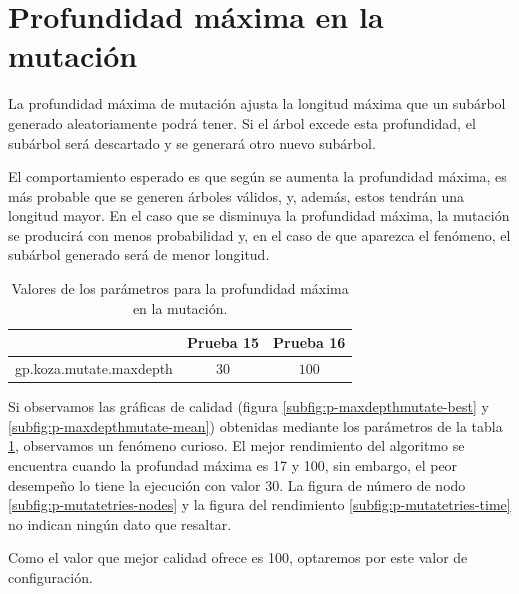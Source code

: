 \section{Profundidad máxima en la mutación}\label{sec:p-prof-mut}	

La profundidad máxima de mutación ajusta la longitud máxima que un subárbol
generado aleatoriamente podrá tener. Si el árbol excede esta profundidad, el
subárbol será descartado y se generará otro nuevo subárbol.

El comportamiento esperado es que según se aumenta la profundidad máxima, es más
probable que se generen árboles válidos, y, además, estos tendrán una longitud
mayor. En el caso que se disminuya la profundidad máxima, la mutación se
producirá con menos probabilidad y, en el caso de que aparezca el fenómeno, el
subárbol generado será de menor longitud.

\begin{table}[cbt]
\caption{Valores de los parámetros para la profundidad máxima en la mutación.}
\label{tab:prof-mut}
\centering
\begin{tabular}{lcc}
\toprule
  &\textbf{Prueba 15} & \textbf{Prueba 16}\\
\midrule
gp.koza.mutate.maxdepth & $30$ & $100$  \\
\bottomrule
\end{tabular}
\end{table}

Si observamos las gráficas de calidad (figura \ref{subfig:p-maxdepthmutate-best}
y \ref{subfig:p-maxdepthmutate-mean}) obtenidas mediante los parámetros de la
tabla \ref{tab:prof-mut}, observamos un fenómeno curioso. El mejor rendimiento
del algoritmo se encuentra cuando la profundad máxima es 17 y 100, sin embargo,
el peor desempeño lo tiene la ejecución con valor 30. La figura de número de
nodo \ref{subfig:p-mutatetries-nodes} y la figura del rendimiento
\ref{subfig:p-mutatetries-time} no indican ningún dato que resaltar.

Como el valor que mejor calidad ofrece es 100, optaremos por este valor de
configuración.


